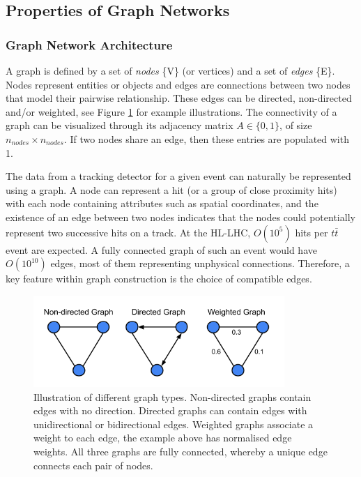 \subsection{Properties of Graph Networks}
\label{properties-graph-networks}

\subsubsection{Graph Network Architecture}

A graph is defined by a set of \textit{nodes} \{V\} (or vertices) and a set of \textit{edges} \{E\}. Nodes represent entities or objects and edges are connections between two nodes that model their pairwise relationship. These edges can be directed, non-directed and/or weighted, see Figure \ref{fig:graph-architecture-example} for example illustrations. The connectivity of a graph can be visualized through its adjacency matrix $A \in \{0, 1\}$, of size $n_{nodes} \times n_{nodes}$. If two nodes share an edge, then these entries are populated with 1. 

The data from a tracking detector for a given event can naturally be represented using a graph. A node can represent a hit (or a group of close proximity hits) with each node containing attributes such as spatial coordinates, and the existence of an edge between two nodes indicates that the nodes could potentially represent two successive hits on a track. At the HL-LHC, $O(10^{5})$ hits per $t\bar{t}$ event are expected. A fully connected graph of such an event would have $O(10^{10})$ edges, most of them representing unphysical connections. Therefore, a key feature within graph construction is the choice of compatible edges. 

\begin{figure}[!htbp]
  \centering
  \includegraphics[width=0.85\textwidth]{images/3-track-reconstruction/Graphs.png}
  \caption{
    Illustration of different graph types. Non-directed graphs contain edges with no direction. Directed graphs can contain edges with unidirectional or bidirectional edges. Weighted graphs associate a weight to each edge, the example above has normalised edge weights. All three graphs are fully connected, whereby a unique edge connects each pair of nodes.
  }
  \label{fig:graph-architecture-example}
\end{figure}


